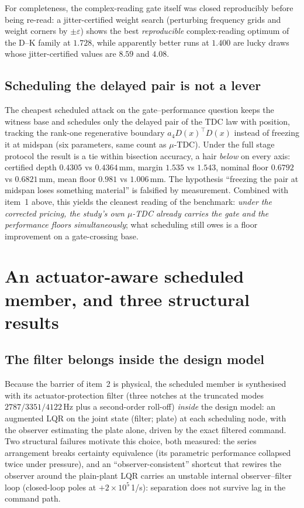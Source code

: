 \documentclass[preprint,12pt]{elsarticle}
\begin{document}
For completeness, the complex-reading gate itself was closed
reproducibly before being re-read: a jitter-certified weight search
(perturbing frequency grids and weight corners by $\pm\varepsilon$)
shows the best \emph{reproducible} complex-reading optimum of the D--K
family at $1.728$, while apparently better runs at $1.400$ are lucky
draws whose jitter-certified values are $8.59$ and $4.08$.

\subsection{Scheduling the delayed pair is not a lever}

The cheapest scheduled attack on the gate--performance question keeps
the witness base and schedules only the delayed pair of the TDC law
with position, tracking the rank-one regenerative boundary
$a_4 D(x)^{\!\top} D(x)$ instead of freezing it at midspan (six
parameters, same count as $\mu$-TDC).  Under the full stage protocol
the result is a tie within bisection accuracy, a hair \emph{below} on
every axis: certified depth $0.4305$ vs $0.4364$\,mm, margin
$1.535$ vs $1.543$, nominal floor $0.6792$ vs $0.6821$\,mm, mean floor
$0.981$ vs $1.006$\,mm.  The hypothesis ``freezing the pair at midspan
loses something material'' is falsified by measurement.  Combined with
item~1 above, this yields the cleanest reading of the benchmark:
\emph{under the corrected pricing, the study's own $\mu$-TDC already
carries the gate and the performance floors simultaneously}; what
scheduling still owes is a floor improvement on a gate-crossing base.

\section{An actuator-aware scheduled member, and three structural
results}
\label{sec:member}

\subsection{The filter belongs inside the design model}

Because the barrier of item~2 is physical, the scheduled member is
synthesised with its actuator-protection filter (three notches at the
truncated modes $2787/3351/4122$\,Hz plus a second-order roll-off)
\emph{inside} the design model: an augmented LQR on the joint state
(filter; plate) at each scheduling node, with the observer estimating
the plate alone, driven by the exact filtered command.  Two structural
failures motivate this choice, both measured: the series
arrangement breaks certainty equivalence (its parametric performance
collapsed twice under pressure), and an ``observer-consistent''
shortcut that rewires the observer around the plain-plant LQR carries
an unstable internal observer--filter loop (closed-loop poles at
$+2\times10^{5}$\,1/s): separation does not survive lag in the command
path.
\end{document}
